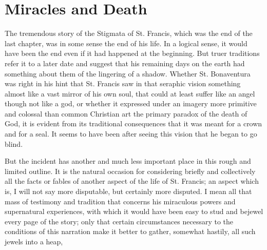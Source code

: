 \documentclass{book}
\begin{document}
\chapter{Miracles and Death}
\label{chapter-8}
The tremendous story of the Stigmata of St. Francis, which was the end of the last chapter, was in some sense the end of his life. In a logical sense, it would have been the end even if it had happened at the beginning. But truer traditions refer it to a later date and suggest that his remaining days on the earth had something about them of the lingering of a shadow. Whether St. Bonaventura was right in his hint that St. Francis saw in that seraphic vision something almost like a vast mirror of his own soul, that could at least suffer like an angel though not like a god, or whether it expressed under an imagery more primitive and colossal than common Christian art the primary paradox of the death of God, it is evident from its traditional consequences that it was meant for a crown and for a seal. It seems to have been after seeing this vision that he began to go blind.

But the incident has another and much less important place in this rough and limited outline. It is the natural occasion for considering briefly and collectively all the facts or fables of another aspect of the life of St. Francis; an aspect which is, I will not say more disputable, but certainly more disputed. I mean all that mass of testimony and tradition that concerns his miraculous powers and supernatural experiences, with which it would have been easy to stud and bejewel every page of the story; only that certain circumstances necessary to the conditions of this narration make it better to gather, somewhat hastily, all such jewels into a heap,
\end{document}
